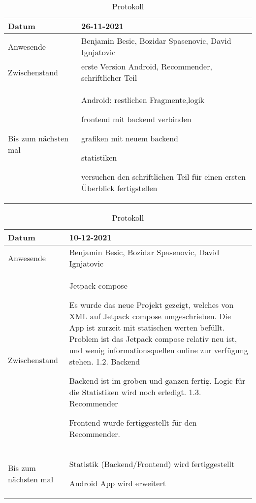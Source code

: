 \begin{table}
    \begin{tabular}{ |p{3cm}|p{10cm}|  }
        \hline
        Datum & 26-11-2021\\
        \hline
        Anwesende & Benjamin Besic, Bozidar Spasenovic, David Ignjatovic\\

        \hline
        Zwischenstand&  erste Version Android, Recommender, schriftlicher Teil
    
    \\
        \hline
        Bis zum nächsten mal &  

       Android: restlichen Fragmente,logik
        

    frontend mit backend verbinden

    grafiken mit neuem backend

    statistiken

    versuchen den schriftlichen Teil für einen ersten Überblick fertigstellen


    
    \\
        \hline
    \end{tabular}
    \caption{Protokoll}
    \label{tab:my_label}
\end{table}
\begin{table}
    \begin{tabular}{ |p{3cm}|p{10cm}|  }
        \hline
        Datum & 10-12-2021\\
        \hline
        Anwesende & Benjamin Besic, Bozidar Spasenovic, David Ignjatovic\\

        \hline
        Zwischenstand&  Jetpack compose

        Es wurde das neue Projekt gezeigt, welches von XML auf Jetpack compose umgeschrieben.
        Die App ist zurzeit mit statischen werten befüllt.
        Problem ist das Jetpack compose relativ neu ist, und wenig informationsquellen online zur verfügung stehen.
        1.2. Backend
        
        Backend ist im groben und ganzen fertig. Logic für die Statistiken wird noch erledigt.
        1.3. Recommender
        
        Frontend wurde fertiggestellt für den Recommender.
        \\
        \hline
        Bis zum nächsten mal &  



        Statistik (Backend/Frontend) wird fertiggestellt

        Android App wird erweitert
    
    
    
    \\
        \hline
    \end{tabular}
    \caption{Protokoll}
    \label{tab:my_label}
\end{table}
